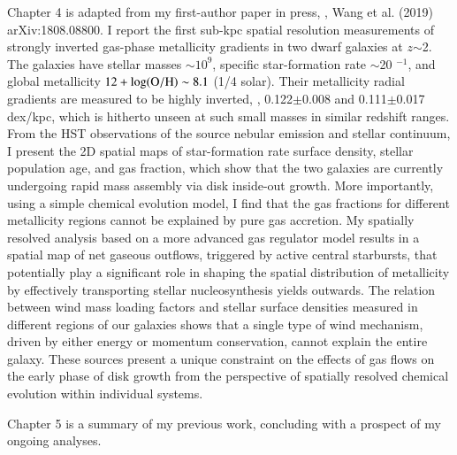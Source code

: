Chapter 4 is adapted from my first-author paper in press, \ie, Wang et al. (2019) arXiv:1808.08800.
I report the first sub-kpc spatial resolution measurements of strongly inverted gas-phase 
metallicity gradients in two dwarf galaxies at $z$$\sim$2.
The galaxies have stellar masses $\sim$$10^9$\Msun, specific star-formation rate $\sim$20 \Gyr$^{-1}$, and 
global metallicity $12+\log({\rm O/H})\sim8.1$ (1/4 solar).
Their metallicity radial gradients are measured to be highly inverted, \ie, 0.122$\pm$0.008 and 
0.111$\pm$0.017 dex/kpc, which is hitherto unseen at such small masses in similar redshift ranges.
From the HST observations of the source nebular emission and stellar continuum, I
present the 2D spatial maps of star-formation rate surface density, stellar population age, and 
gas fraction, which show that the two galaxies are currently undergoing rapid mass assembly via disk 
inside-out growth.  More importantly, using a simple chemical evolution model, I find that the gas 
fractions for different metallicity regions cannot be explained by pure gas accretion.  My spatially 
resolved analysis based on a more advanced gas regulator model results in a spatial map of net gaseous 
outflows, triggered by active central starbursts, that potentially play a significant role in shaping the 
spatial distribution of metallicity by effectively transporting stellar nucleosynthesis yields outwards.  
The relation between wind mass loading factors and stellar surface densities measured in different regions 
of our galaxies shows that a single type of wind mechanism, driven by either energy or momentum 
conservation, cannot explain the entire galaxy.  These sources present a unique constraint on the effects 
of gas flows on the early phase of disk growth from the perspective of spatially resolved chemical 
evolution within individual systems.

Chapter 5 is a summary of my previous work, concluding with a prospect of my ongoing analyses.


